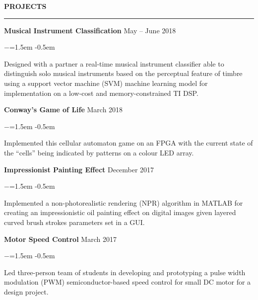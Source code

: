 \documentclass[letterpaper,11pt]{article}
\def\sectionlineskip{\smallskip} %
\def\sectionskip{\smallskip} %
\newenvironment{rSection}[1]{ %
\sectionskip
\MakeUppercase{\bf #1} %
\sectionlineskip
\hrule %
\begin{list}{}{ %
\setlength{\leftmargin}{1.5em} %
}
\item[]
}{\end{list}}
\newenvironment{rSubsection}[6]{ %
{\bf #1} \hfill {#2} \\ %
\ifthenelse{\equal{#3}{}}{}{ %
{#3} \hfill {#4} \\
}
\ifthenelse{\equal{#5}{}}{}{ %
{#5} \hfill {#6} \\
}

\begin{list}{$-$}{\leftmargin=1.5em} %
\itemsep -0.5em \vspace{-0.5em} %
\medskip
}{\end{list}}
\begin{document}
\begin{rSection}{Projects} 

\begin{rSubsection}{Musical Instrument Classification}{May -- June 2018}{}{}{}{}  

\item Designed with a partner a real-time musical instrument classifier able to distinguish solo musical instruments based on the perceptual feature of timbre using a support vector machine (SVM) machine learning model for implementation on a low-cost and memory-constrained TI DSP. 

\end{rSubsection}


\begin{rSubsection}{Conway's Game of Life}{March 2018}{}{}{}{}  

\item Implemented this cellular automaton game on an FPGA with the current state of the “cells” being indicated by patterns on a colour LED array.  

\end{rSubsection}


\begin{rSubsection}{Impressionist Painting Effect}{December 2017}{}{}{}{} 

\item Implemented a non-photorealistic rendering (NPR) algorithm in MATLAB for creating an impressionistic oil painting effect on digital images given layered curved brush strokes parameters set in a GUI.   

\end{rSubsection}


\begin{rSubsection}{Motor Speed Control}{March 2017}{}{}{}{} 

\item Led three-person team of students in developing and prototyping a pulse width modulation (PWM) semiconductor-based speed control for small DC motor for a design project.

\end{rSubsection} 

\end{rSection} 
\end{document}
